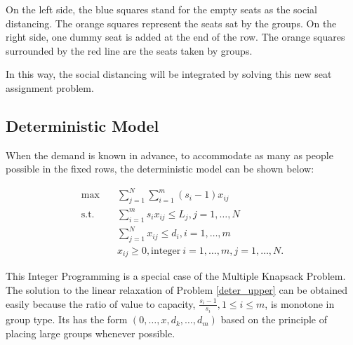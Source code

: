 On the left side, the blue squares stand for the empty seats as the social distancing. The orange squares represent the seats sat by the groups. 
On the right side, one dummy seat is added at the end of the row. The orange squares surrounded by the red line are the seats taken by groups.

In this way, the social distancing will be integrated by solving this new seat assignment problem.


\subsection{Deterministic Model}
When the demand is known in advance, to accommodate as many as people possible in the fixed rows, the deterministic model can be shown below:

\begin{equation}\label{deter_upper}
    \begin{aligned}
      \max \quad & \sum_{j =1}^{N} \sum_{i = 1}^{m} (s_i -1) x_{ij} \\
      \text {s.t.} \quad & \sum_{i = 1}^{m} s_i x_{ij} \leq L_{j}, j=1,\ldots,N \\
      & \sum_{j =1}^{N} x_{ij} \leq d_{i}, i=1,\ldots,m \\
      & x_{ij} \geq 0, \text{integer}~ i=1,\ldots,m, j=1,\ldots,N.
    \end{aligned}
\end{equation}

This Integer Programming is a special case of the Multiple Knapsack Problem. The solution to the linear relaxation of Problem \eqref{deter_upper} can be obtained easily because the ratio of value to capacity, $\frac{s_i-1}{s_i}, 1 \leq i \leq m$, is monotone in group type. Its has the form $(0,\ldots, x,d_{k}, \ldots, d_{m})$ based on the principle of placing large groups whenever possible.
 








